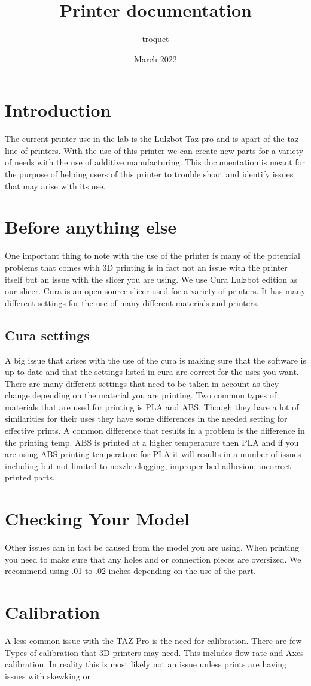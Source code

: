 \documentclass{article}
\title{Printer documentation}
\author{troquet }
\date{March 2022}
\begin{document}
\maketitle

\section{Introduction}
The current printer use in the lab is the Lulzbot Taz pro and is apart of the taz line of printers. With the use of this printer we can create new parts for a variety of needs with the use of additive manufacturing. This documentation is meant for the purpose of helping users of this printer to trouble shoot and identify issues that may arise with its use. 

\section{Before anything else}
One important thing to note with the use of the printer is many of the potential problems that comes with 3D printing is in fact not an issue with the printer itself but an issue with the slicer you are using. We use Cura Lulzbot edition as our slicer. Cura is an open source slicer used for a variety of printers. It has many different settings for the use of many different materials and printers. 

\subsection{Cura settings} 
A big issue that arises with the use of the cura is making sure that the software is up to date and that the settings listed in cura are correct for the uses you want. There are many different settings that need to be taken in account as they change depending on the material you are printing. 
Two common types of materials that are used for printing is PLA and ABS. Though they bare a lot of similarities for their uses they have some differences in the needed setting for effective prints. A common difference that results in a problem is the difference in the printing temp. ABS is printed at a higher temperature then PLA and if you are using ABS printing temperature for PLA it will results in a number of issues including but not limited to nozzle clogging, improper bed adhesion, incorrect printed parts. 

\section{Checking Your Model}
Other issues can in fact be caused from the model you are using. When printing you need to make sure that any holes and or connection pieces are oversized. We recommend using .01 to .02 inches depending on the use of the part. 

\section{Calibration}
A less common issue with the TAZ Pro is the need for calibration. There are few Types of calibration that 3D printers may need. This includes flow rate and Axes calibration. In reality this is most likely not an issue unless prints are having issues with skewking or    
\end{document}
